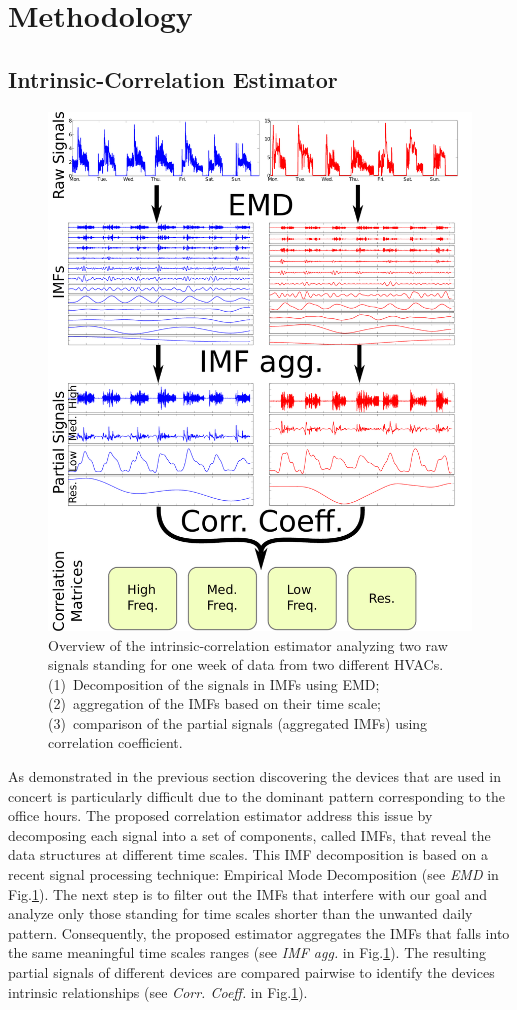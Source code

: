 
\section{Methodology}

\subsection{Intrinsic-Correlation Estimator} \label{methodo:est}

\begin{figure}[t!]
 \includegraphics[width=.5\textwidth]{img/estimator.pdf}
 \caption{Overview of the intrinsic-correlation estimator analyzing two raw signals standing for one week of data from two different HVACs. (1)~Decomposition of the signals in IMFs using EMD; (2)~aggregation of the IMFs based on their time scale; (3)~comparison of the partial signals (aggregated IMFs) using correlation coefficient.}
 \label{fig:diagram1}
\end{figure}

As demonstrated in the previous section discovering the devices that are used in concert is particularly difficult due to the dominant pattern corresponding to the office hours.
The proposed correlation estimator address this issue by decomposing each signal into a set of components, called IMFs, that reveal the data structures at different time scales.
This IMF decomposition is based on a recent signal processing technique: Empirical Mode Decomposition (see \emph{EMD} in Fig.\ref{fig:diagram1}).
The next step is to filter out the IMFs that interfere with our goal and analyze only those standing for time scales shorter than the unwanted daily pattern.
Consequently, the proposed estimator aggregates the IMFs that falls into the same meaningful time scales ranges (see \emph{IMF agg.} in Fig.\ref{fig:diagram1}).
The resulting partial signals of different devices are compared pairwise to identify the devices intrinsic relationships (see \emph{Corr. Coeff.} in Fig.\ref{fig:diagram1}). 

